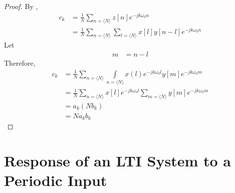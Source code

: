 \documentclass[titlepage, fleqn, a4paper, 12pt, twoside]{article}
\theoremstyle{definition}
\theoremstyle{theorem}
\begin{document}
\begin{proof}
	By ,
	\begin{align*}
		c_k &= \frac{1}{N} \sum\limits_{n = \langle N \rangle} z[n] e^{-j k \omega_0 n}\\
		&= \frac{1}{N} \sum\limits_{n = \langle N \rangle} \sum\limits_{l = \langle N \rangle} x[l] y[n - l] e^{-j k \omega_0 n}
	\end{align*}
	Let
	\begin{align*}
		m &= n - l
	\end{align*}
	Therefore,
	\begin{align*}
		c_k &= \frac{1}{N} \sum\limits_{n = \langle N \rangle} \int\limits_{n = \langle N \rangle} x(l) e^{-j k \omega_0 l} y[m] e^{-j k \omega_0 m}\\
		&= \frac{1}{N} \sum\limits_{n = \langle N \rangle} x[l] e^{-j k \omega_0 l} \sum\limits_{m = \langle N \rangle} y[m] e^{-j k \omega_0 m}\\
		&= a_k (N b_k)\\
		&= N a_k b_k
	\end{align*}
\end{proof}

\section{Response of an LTI System to a Periodic Input}
\end{document}
